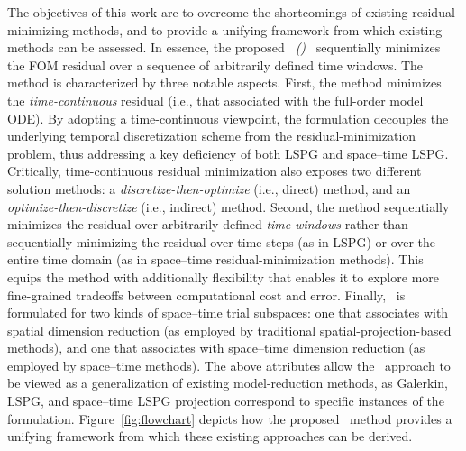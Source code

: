 \documentclass[3p,computermodern,10pt]{elsarticle}
\begin{document}
The objectives of this work are to overcome the shortcomings of existing
residual-minimizing methods, and to provide a unifying framework from which
existing methods can be assessed. In essence, the proposed \textit{\methodNameLower\
(\methodAcronym)} \approachKwd\ sequentially minimizes the FOM
residual over a sequence of arbitrarily defined
time windows. The method is characterized by three notable aspects.  First, the method
minimizes the \textit{time-continuous}  residual (i.e., that associated with
the full-order model ODE). By adopting a time-continuous viewpoint, the
formulation decouples the underlying temporal discretization scheme from the
residual-minimization problem, thus addressing a key deficiency of both LSPG
and space--time LSPG. Critically, time-continuous residual minimization also exposes
two different solution methods:  a \textit{discretize-then-optimize}
(i.e., direct) method, and an \textit{optimize-then-discretize} (i.e.,
indirect) method. Second, the method sequentially minimizes
the residual over arbitrarily defined \textit{time windows} rather than
sequentially minimizing the residual over time steps (as in LSPG)
or over the entire time domain (as in space--time residual-minimization
methods). This equips the method with additionally flexibility that enables it
to explore more fine-grained tradeoffs between computational cost and error.
Finally, \methodAcronym\ is formulated for two kinds of space--time trial
subspaces: one that associates with spatial dimension reduction (as employed by traditional spatial-projection-based methods), and one that associates with space--time dimension reduction (as employed by space--time methods).
The above attributes allow the \methodAcronym\ approach to be viewed as a
generalization of existing model-reduction methods, as 
Galerkin, LSPG, and space--time LSPG projection correspond to specific
instances of the formulation.
Figure~\ref{fig:flowchart} depicts how the proposed \methodAcronym\ method
provides a unifying framework from which these existing approaches can be derived.
\end{document}
